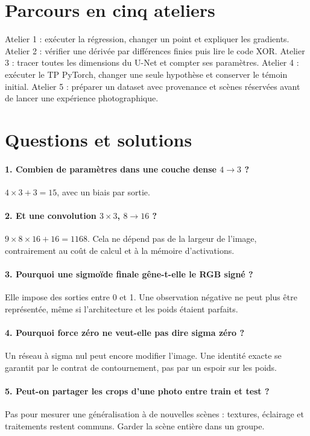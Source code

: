 \documentclass[12pt,a4paper,oneside]{report}
\begin{document}
\section{Parcours en cinq ateliers}

Atelier 1 : exécuter la régression, changer un point et expliquer les gradients.
Atelier 2 : vérifier une dérivée par différences finies puis lire le code XOR.
Atelier 3 : tracer toutes les dimensions du U-Net et compter ses paramètres.
Atelier 4 : exécuter le TP PyTorch, changer une seule hypothèse et conserver
le témoin initial. Atelier 5 : préparer un dataset avec provenance et scènes
réservées avant de lancer une expérience photographique.

\section{Questions et solutions}

\paragraph{1. Combien de paramètres dans une couche dense $4\to3$ ?}
$4\times3+3=15$, avec un biais par sortie.

\paragraph{2. Et une convolution $3\times3$, $8\to16$ ?}
$9\times8\times16+16=1168$. Cela ne dépend pas de la largeur de l'image,
contrairement au coût de calcul et à la mémoire d'activations.

\paragraph{3. Pourquoi une sigmoïde finale gêne-t-elle le RGB signé ?}
Elle impose des sorties entre 0 et 1. Une observation négative ne peut plus
être représentée, même si l'architecture et les poids étaient parfaits.

\paragraph{4. Pourquoi force zéro ne veut-elle pas dire sigma zéro ?}
Un réseau à sigma nul peut encore modifier l'image. Une identité exacte
se garantit par le contrat de contournement, pas par un espoir sur les poids.

\paragraph{5. Peut-on partager les crops d'une photo entre train et test ?}
Pas pour mesurer une généralisation à de nouvelles scènes : textures,
éclairage et traitements restent communs. Garder la scène entière dans un groupe.
\end{document}
